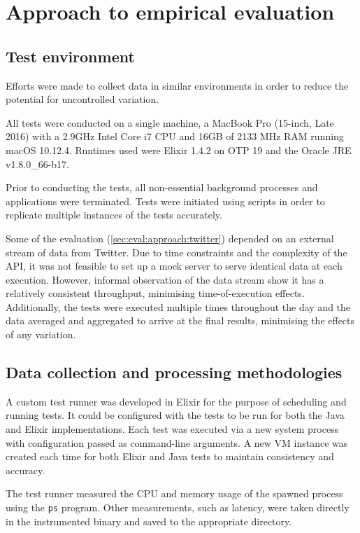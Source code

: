 \section{Approach to empirical evaluation}\label{sec:eval:approach}

\subsection{Test environment}\label{sec:eval:approach:environment}

Efforts were made to collect data in similar environments in order to reduce the potential for uncontrolled variation.

All tests were conducted on a single machine, a MacBook Pro (15-inch, Late 2016) with a 2.9GHz Intel Core i7 CPU and 16GB of 2133 MHz RAM running macOS 10.12.4.
Runtimes used were Elixir 1.4.2 on OTP 19 and the Oracle JRE v1.8.0\_66-b17.

Prior to conducting the tests, all non-essential background processes and applications were terminated.
Tests were initiated using scripts in order to replicate multiple instances of the tests accurately.

Some of the evaluation (\cref{sec:eval:approach:twitter}) depended on an external stream of data from Twitter.
Due to time constraints and the complexity of the API, it was not feasible to set up a mock server to serve identical data at each execution.
However, informal observation of the data stream show it has a relatively consistent throughput, minimising time-of-execution effects.
Additionally, the tests were executed multiple times throughout the day and the data averaged and aggregated to arrive at the final results, minimising the effects of any variation.

\subsection{Data collection and processing methodologies}\label{sec:eval:approach:collection}

A custom test runner was developed in Elixir for the purpose of scheduling and running tests.
It could be configured with the tests to be run for both the Java and Elixir implementations.
Each test was executed via a new system process with configuration passed as command-line arguments.
A new VM instance was created each time for both Elixir and Java tests to maintain consistency and accuracy.

The test runner measured the CPU and memory usage of the spawned process using the \verb|ps| program.
Other measurements, such as latency, were taken directly in the instrumented binary and saved to the appropriate directory.

